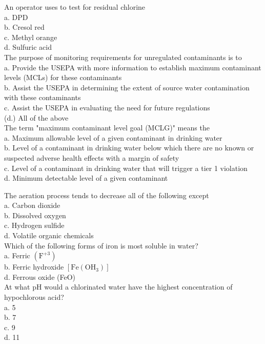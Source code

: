 An operator uses to test for residual chlorine\\
a. DPD\\
b. Cresol red\\
c. Methyl orange\\
d. Sulfuric acid\\

The purpose of monitoring requirements for unregulated contaminants is to\\
a. Provide the USEPA with more information to establish maximum contaminant levels (MCLs) for these contaminants\\
b. Assist the USEPA in determining the extent of source water contamination with these contaminants\\
c. Assist the USEPA in evaluating the need for future regulations\\
(d.) All of the above\\

The term "maximum contaminant level goal (MCLG)" means the\\
a. Maximum allowable level of a given contaminant in drinking water\\
b.  Level of a contaminant in drinking water below which there are no known or suspected adverse health effects with a margin of safety\\
c. Level of a contaminant in drinking water that will trigger a tier 1 violation\\
d. Minimum detectable level of a given contaminant 

The aeration process tends to decrease all of the following except\\
a. Carbon dioxide\\
b. Dissolved oxygen\\
c. Hydrogen sulfide\\
d. Volatile organic chemicals\\

Which of the following forms of iron is most soluble in water?\\
a. Ferric $\left(\mathrm{F}^{+3}\right)$\\
b. Ferric hydroxide $\left[\mathrm{Fe}\left(\mathrm{OH}_{3}\right)\right]$\\
d. Ferrous oxide (FeO)\\

At what $\mathrm{pH}$ would a chlorinated water have the highest concentration of hypochlorous acid?\\
a. 5\\
b. 7\\
c. 9\\
d. 11\\

